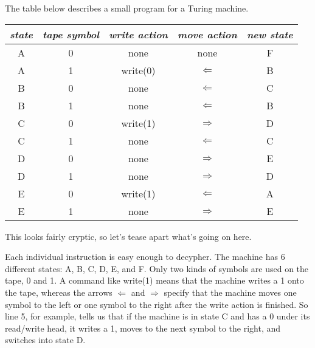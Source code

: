 \begin{examplebox}
    The table below describes a small program for a Turing machine.
    \begin{center}
        \begin{tabular}{cc|ccc}
            \emph{state} & \emph{tape symbol} & \emph{write action} & \emph{move action} & \emph{new state}\\
            \hline
            A            & 0                  & none                & none               & F\\
            A            & 1                  & write(0)            & $\Leftarrow$       & B\\
            B            & 0                  & none                & $\Leftarrow$       & C\\
            B            & 1                  & none                & $\Leftarrow$       & B\\
            C            & 0                  & write(1)            & $\Rightarrow$      & D\\
            C            & 1                  & none                & $\Leftarrow$       & C\\
            D            & 0                  & none                & $\Rightarrow$      & E\\
            D            & 1                  & none                & $\Rightarrow$      & D\\
            E            & 0                  & write(1)            & $\Leftarrow$       & A\\
            E            & 1                  & none                & $\Rightarrow$      & E\\
        \end{tabular}
    \end{center}
    This looks fairly cryptic, so let's tease apart what's going on here.

    Each individual instruction is easy enough to decypher.
    The machine has 6 different states: A, B, C, D, E, and F.
    Only two kinds of symbols are used on the tape, 0 and 1.
    A command like write(1) means that the machine writes a 1 onto the tape, whereas the arrows $\Leftarrow$ and $\Rightarrow$ specify that the machine moves one symbol to the left or one symbol to the right after the write action is finished.
    So line 5, for example, tells us that if the machine is in state C and has a 0 under its read/write head, it writes a 1, moves to the next symbol to the right, and switches into state D.


\end{examplebox}
